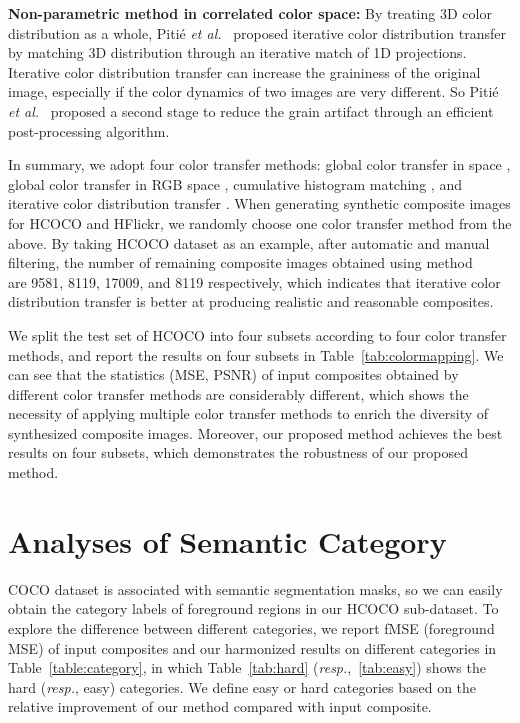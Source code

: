 \documentclass[10pt,twocolumn,letterpaper]{article}
\begin{document}
\textbf{Non-parametric method in correlated color space: }By treating 3D color distribution as a whole, Pitié \textit{et al.}~\cite{Pitie2005ndimensionalsupp} proposed iterative color distribution transfer by matching 3D distribution through an iterative match of 1D projections. Iterative color distribution transfer can increase the graininess of the original image, especially if the color dynamics of two images are very different. So Pitié \textit{et al.}~\cite{pitie2007automatedsupp} proposed a second stage to reduce the grain artifact through an efficient post-processing algorithm.


In summary, we adopt four color transfer methods: global color transfer in  space \cite{reinhard2001colorsupp}, global color transfer in RGB space \cite{xiao2006colorsupp}, cumulative histogram matching \cite{fecker2008histogramsupp}, and iterative color distribution transfer \cite{pitie2007automatedsupp}. When generating synthetic composite images for HCOCO and HFlickr, we randomly choose one color transfer method from the above.
By taking HCOCO dataset as an example, after automatic and manual filtering, the number of remaining composite images obtained using method~\cite{reinhard2001colorsupp}~\cite{xiao2006colorsupp}~\cite{pitie2007automatedsupp}~\cite{fecker2008histogramsupp} are 9581, 8119, 17009, and 8119 respectively, which indicates that iterative color distribution transfer \cite{pitie2007automatedsupp} is better at producing realistic and reasonable composites. 

We split the test set of HCOCO into four subsets according to four color transfer methods, and report the results on four subsets in Table~\ref{tab:colormapping}. We can see that the statistics (MSE, PSNR) of input composites obtained by different color transfer methods are considerably different, which shows the necessity of applying multiple color transfer methods to enrich the diversity of synthesized composite images. Moreover, our proposed method achieves the best results on four subsets, which demonstrates the robustness of our proposed method.

\section{Analyses of Semantic Category} \label{sec:category}


COCO dataset is associated with semantic segmentation masks, so we can easily obtain the category labels of foreground regions in our HCOCO sub-dataset. To explore the difference between different categories, we report fMSE (foreground MSE) of input composites and our harmonized results on different categories in Table~\ref{table:category}, in which Table~\ref{tab:hard} (\emph{resp.},~\ref{tab:easy}) shows the hard (\emph{resp.}, easy) categories. We define easy or hard categories based on the relative improvement of our method compared with input composite.
\end{document}
